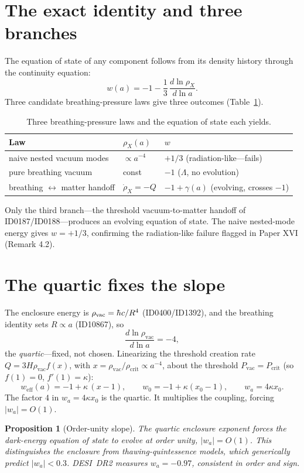 \documentclass[11pt]{article}
\newtheorem{proposition}[theorem]{Proposition}
\theoremstyle{remark}
\newcommand{\hbb}{\ensuremath{\mathchar'26\mkern-9mu h}}
\begin{document}
\section{The exact identity and three branches}
\label{sec:identity}
The equation of state of any component follows from its density history through the continuity equation:
\begin{equation}
w(a) = -1 - \frac{1}{3}\,\frac{d\ln\rho_X}{d\ln a}.
\label{eq:woa}
\end{equation}
Three candidate breathing-pressure laws give three outcomes (Table~\ref{tab:branches}).
\begin{table}[ht]
\centering
\caption{Three breathing-pressure laws and the equation of state each yields.}
\label{tab:branches}
\begin{tabular}{lll}
\toprule
Law & $\rho_X(a)$ & $w$ \\
\midrule
naive nested vacuum modes & $\propto a^{-4}$ & $+1/3$ (radiation-like---fails) \\
pure breathing vacuum & const & $-1$ ($\Lambda$, no evolution) \\
breathing $\leftrightarrow$ matter handoff & $\dot\rho_X = -Q$ & $-1 + \gamma(a)$ (evolving, crosses $-1$) \\
\bottomrule
\end{tabular}
\end{table}
Only the third branch---the threshold vacuum-to-matter handoff of ID0187/ID0188---produces an evolving equation of state. The naive nested-mode energy gives $w = +1/3$, confirming the radiation-like failure flagged in Paper XVI (Remark 4.2).

\section{The quartic fixes the slope}
\label{sec:quartic}
The enclosure energy is $\rho_{\mathrm{vac}} = \hbb c/R^4$ (ID0400/ID1392), and the breathing identity sets $R \propto a$ (ID10867), so
\begin{equation}
\frac{d\ln\rho_{\mathrm{vac}}}{d\ln a} = -4,
\label{eq:quartic}
\end{equation}
the \emph{quartic}---fixed, not chosen. Linearizing the threshold creation rate $Q = 3H\rho_{\mathrm{vac}}f(x)$, with $x = \rho_{\mathrm{vac}}/\rho_{\mathrm{crit}} \propto a^{-4}$, about the threshold $P_{\mathrm{vac}} = P_{\mathrm{crit}}$ (so $f(1) = 0$, $f'(1) = \kappa$):
\begin{equation}
w_{\mathrm{eff}}(a) = -1 + \kappa\,(x - 1), \qquad
w_0 = -1 + \kappa(x_0 - 1), \qquad
w_a = 4\kappa x_0.
\label{eq:wawb}
\end{equation}
The factor $4$ in $w_a = 4\kappa x_0$ is the quartic. It multiplies the coupling, forcing $|w_a| = O(1)$.
\begin{proposition}[Order-unity slope]
\label{prop:order}
The quartic enclosure exponent forces the dark-energy equation of state to evolve at order unity, $|w_a| = O(1)$. This distinguishes the enclosure from thawing-quintessence models, which generically predict $|w_a| < 0.3$. DESI~DR2 measures $w_a = -0.97$, consistent in order and sign.
\end{proposition}
\end{document}
